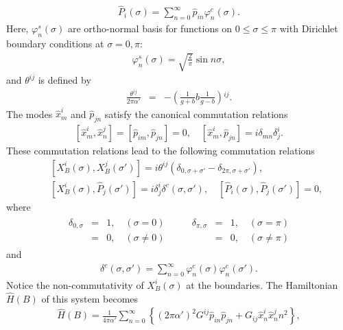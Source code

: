 \documentclass[a4paper,12pt]{article}
\newcommand{\nn}{\nonumber\\}
\newcommand{\co}{\varphi^c}
\newcommand{\si}{\varphi^s}
\newcommand{\XB}{X_B}
\begin{document}
%
\begin{eqnarray}
 \label{hPmod}
\hat{P}_i(\sigma)
=
\sum_{n=0}^{\infty} \hat{p}_{i n} \co_n (\sigma) .
\end{eqnarray}
Here, $\si_n(\sigma)$ are ortho-normal
basis for functions on $0\le \sigma \le \pi$
with Dirichlet boundary conditions
at $\sigma = 0,\pi$:
\begin{eqnarray}
 \label{defsi}
\si_n(\sigma) = \sqrt{\frac{2}{\pi}} \sin n \sigma ,
\end{eqnarray}
%
and $\theta^{ij}$ is defined by
\begin{eqnarray}
 \label{theta}
\frac{\theta^{ij}}{2\pi \alpha'}
&=& -  
\left(
\frac{1}{g+b} b \frac{1}{g-b}
\right)\!{}^{ij}.
\end{eqnarray}
The modes $\hat{x}^i_m$ and  $\hat{p}_{j n}$
satisfy the  canonical commutation relations
\begin{eqnarray}
 \label{commB}
[\hat{x}^i_m, \hat{x}^j_n] = 
[\hat{p}_{i m},\hat{p}_{j n}] = 0, \quad
[\hat{x}^i_m, \hat{p}_{j n} ] = i \delta_{mn} \delta^i_j.
\end{eqnarray}
These commutation relations
lead to the following commutation relations
\begin{eqnarray}
 \label{commXP}
&&[ \XB^i(\sigma), \XB^j(\sigma')] 
=
i \theta^{ij}
\left(
 \delta_{0,\sigma+\sigma'}
-\delta_{2\pi,\sigma+\sigma'}
\right), \nn
&&[ \XB^i(\sigma), \hat{P}_j(\sigma')] = 
i \delta^i_j \delta^c (\sigma, \sigma'),  \quad
[\hat{P}_{i}(\sigma),  \hat{P}_j(\sigma') ] = 0,
\end{eqnarray}
where
\begin{eqnarray}
  \label{Krod}
 \begin{array}{lll}
\delta_{0,\sigma} &=& 1, \quad (\sigma = 0) \\
                  &=& 0, \quad (\sigma \ne 0)
 \end{array}
\qquad
 \begin{array}{lll}
\delta_{\pi,\sigma} &=& 1, \quad (\sigma = \pi) \\
                    &=& 0, \quad (\sigma \ne \pi)
 \end{array}
\end{eqnarray}
and
\begin{eqnarray}
 \label{deltac}
\delta^c (\sigma,\sigma') =
\sum_{n=0}^{\infty} \co_n(\sigma) \co_n(\sigma').
\end{eqnarray}
Notice the non-commutativity of $\XB^i(\sigma)$
at the boundaries.
%
The Hamiltonian $\hat{H}(B)$ of this system
becomes
\begin{eqnarray}
\hat{H}(B) = \frac{1}{4\pi\alpha'}
\sum_{n=0}^\infty
\left\{
(2\pi\alpha')^2 G^{ij}\hat{p}_{i n} \hat{p}_{j n} 
+
G_{ij} \hat{x}^i_n \hat{x}^j_n n^2
\right\},
\end{eqnarray}
\end{document}
